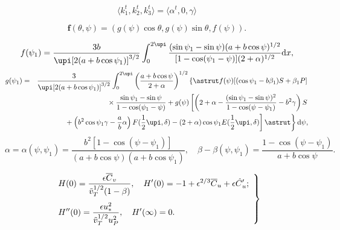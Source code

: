 \documentclass[lineno]{jfm}
\begin{document}
\begin{equation}
 \langle k^t_1,k^t_2,k^t_3\rangle = \langle
\alpha^t,0,\gamma\rangle
\end{equation}

\begin{equation}
\boldsymbol{f}(\theta,\psi) = (g(\psi)\cos \theta,g(\psi) \sin \theta,f(\psi)).
\label{eq41}
\end{equation}

\begin{eqnarray}
f(\psi_1) = \frac{3b}{\upi[2(a+b \cos \psi_1)]^{{3}/{2}}}
  \int^{2\upi}_0 \frac{(\sin \psi_1 - \sin \psi)(a+b \cos \psi)^{1/2}}%
  {[1 - \cos (\psi_1 - \psi)](2+\alpha)^{1/2}}\mathrm{d}x,
\label{eq42}
\end{eqnarray}
\begin{eqnarray}
g(\psi_1) & = & \frac{3}{\upi[2(a+b \cos \psi_1)]^{{3}/{2}}}
  \int^{2\upi}_0 \left(\frac{a+b \cos \psi}{2+\alpha}\right)^{1/2}
  \left\{ \astrut f(\psi)[(\cos \psi_1 - b \beta_1)S + \beta_1P]
  \right. \nonumber\\
&& \mbox{}\times \frac{\sin \psi_1 - \sin \psi}{1-\cos(\psi_1 - \psi)}
  + g(\psi) \left[\left(2+\alpha - \frac{(\sin \psi_1 - \sin \psi)^2}
  {1- \cos (\psi - \psi_1)} - b^2 \gamma \right) S \right.\nonumber\\
&& \left.\left.\mbox{} + \left( b^2 \cos \psi_1\gamma -
  \frac{a}{b}\alpha \right) F(\frac{1}{2}\upi, \delta) - (2+\alpha)
  \cos\psi_1 E(\frac{1}{2}\upi, \delta)\right] \astrut\right\} \mathrm{d} \psi,
\label{eq43}
\end{eqnarray}
\begin{equation}
\alpha = \alpha(\psi,\psi_1) = \frac{b^2[1-\cos(\psi-\psi_1)]}%
  {(a+b\cos\psi) (a+b\cos\psi_1)},
  \quad
  \beta - \beta(\psi,\psi_1) = \frac{1-\cos(\psi-\psi_1)}{a+b\cos\psi}.
\end{equation}


\begin{equation}
\left. \begin{array}{l}
\displaystyle
H(0) = \frac{\epsilon \overline{C}_v}{\tilde{v}^{{1}/{2}}_T
(1- \beta)},\quad H'(0) = -1+\epsilon^{{2}/{3}} \overline{C}_u
+ \epsilon \skew5\hat{C}_u'; \\[16pt]
\displaystyle
H''(0) = \frac{\epsilon u^2_{\ast}}{\tilde{v}^{{1}/{2}}
_T u^2_P},\quad H' (\infty) = 0.
\end{array} \right\}
\end{equation}
\end{document}
